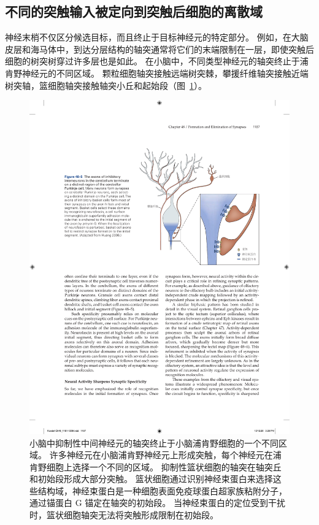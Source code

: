 \subsection{不同的突触输入被定向到突触后细胞的离散域}


神经末梢不仅区分候选目标，而且终止于目标神经元的特定部分。
例如，在大脑皮层和海马体中，到达分层结构的轴突通常将它们的末端限制在一层，即使突触后细胞的树突树穿过许多层也是如此。
在小脑中，不同类型神经元的轴突终止于浦肯野神经元的不同区域。
颗粒细胞轴突接触远端树突棘，攀援纤维轴突接触近端树突轴，篮细胞轴突接触轴突小丘和起始段（图~\ref{fig:48_5}）。


\begin{figure}[htbp]
	\centering
	\includegraphics[width=0.83\linewidth]{chap48/fig_48_5}
	\caption{小脑中抑制性中间神经元的轴突终止于小脑浦肯野细胞的一个不同区域。
		许多神经元在小脑浦肯野神经元上形成突触，每个神经元在浦肯野细胞上选择一个不同的区域。
		抑制性篮状细胞的轴突在轴突丘和初始段形成大部分突触。
		篮状细胞通过识别神经束蛋白来选择这些结构域，神经束蛋白是一种细胞表面免疫球蛋白超家族粘附分子，通过锚蛋白 G 锚定在轴突的初始段。
		当神经束蛋白的定位受到干扰时，篮状细胞轴突无法将突触形成限制在初始段\cite{huang2006subcellular}。}
	\label{fig:48_5}
\end{figure}


